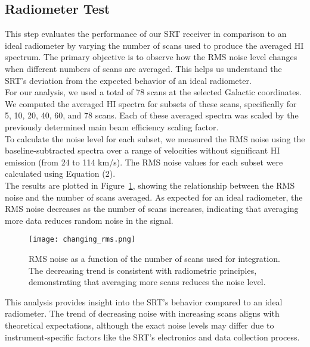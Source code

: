 \documentclass[linenumbers,twocolumn]{aastex631}
\begin{document}
\subsection{Radiometer Test}

This step evaluates the performance of our SRT receiver in comparison to an ideal radiometer by varying the number of scans used to produce the averaged HI spectrum. The primary objective is to observe how the RMS noise level changes when different numbers of scans are averaged. This helps us understand the SRT’s deviation from the expected behavior of an ideal radiometer. \\

For our analysis, we used a total of 78 scans at the selected Galactic coordinates. We computed the averaged HI spectra for subsets of these scans, specifically for 5, 10, 20, 40, 60, and 78 scans. Each of these averaged spectra was scaled by the previously determined main beam efficiency scaling factor. \\

To calculate the noise level for each subset, we measured the RMS noise using the baseline-subtracted spectra over a range of velocities without significant HI emission (from 24 to 114 km/s). The RMS noise values for each subset were calculated using Equation (2). \\

The results are plotted in Figure~\ref{fig:rms_noise_vs_scans}, showing the relationship between the RMS noise and the number of scans averaged. As expected for an ideal radiometer, the RMS noise decreases as the number of scans increases, indicating that averaging more data reduces random noise in the signal. \\

\begin{figure}[h]
    \centering
    \texttt{[image: changing\_rms.png]}
    \caption{RMS noise as a function of the number of scans used for integration. The decreasing trend is consistent with radiometric principles, demonstrating that averaging more scans reduces the noise level.}
    \label{fig:rms_noise_vs_scans}
\end{figure}

This analysis provides insight into the SRT's behavior compared to an ideal radiometer. The trend of decreasing noise with increasing scans aligns with theoretical expectations, although the exact noise levels may differ due to instrument-specific factors like the SRT’s electronics and data collection process.
\end{document}

